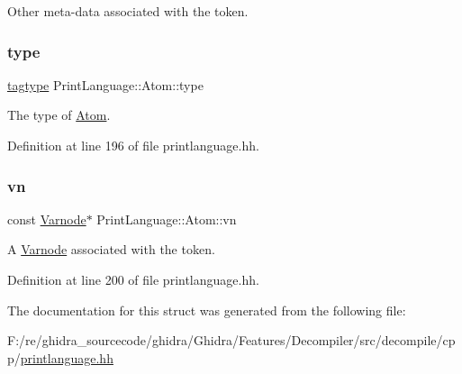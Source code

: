 Other meta-\/data associated with the token. 

\mbox{\label{struct_print_language_1_1_atom_a726e891470417405fc6259bfbb2f17b4}} 
\subsubsection{\texorpdfstring{type}{type}}
{\footnotesize\ttfamily \mbox{\hyperlink{class_print_language_a7102f70f47777d8b17af52c5157c473e}{tagtype}} Print\+Language\+::\+Atom\+::type}



The type of \mbox{\hyperlink{struct_print_language_1_1_atom}{Atom}}. 



Definition at line 196 of file printlanguage.\+hh.

\mbox{\label{struct_print_language_1_1_atom_a0dea44d33527d1af476eba9e398fb39e}} 
\subsubsection{\texorpdfstring{vn}{vn}}
{\footnotesize\ttfamily const \mbox{\hyperlink{class_varnode}{Varnode}}$\ast$ Print\+Language\+::\+Atom\+::vn}



A \mbox{\hyperlink{class_varnode}{Varnode}} associated with the token. 



Definition at line 200 of file printlanguage.\+hh.



The documentation for this struct was generated from the following file\+:\begin{DoxyCompactItemize}
\item 
F\+:/re/ghidra\+\_\+sourcecode/ghidra/\+Ghidra/\+Features/\+Decompiler/src/decompile/cpp/\mbox{\hyperlink{printlanguage_8hh}{printlanguage.\+hh}}\end{DoxyCompactItemize}
